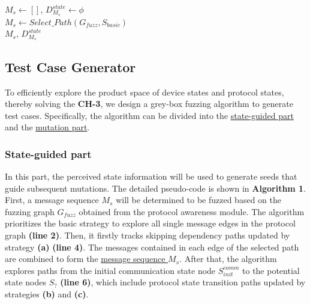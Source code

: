 \documentclass[10pt,journal,compsoc]{IEEEtran}
\begin{document}
\begin{algorithm}[t]
        \caption{Fuzzing Algorithm(State-Guided Part).}\label{alg:1}
        $M_{s} \gets [] $, $D_{M_{s}}^{state} \gets \phi$ \\
        $M_{s} \gets Select\_Path(G_{fuzz}, S_{basic})$ \\
        \Return $M_{s}$, $D_{M_{s}}^{state}$ 
        
\vspace{0cm}
\end{algorithm}

\subsection{Test Case Generator}  \label{6-1}

To efficiently explore the product space of device states and protocol states, thereby solving the \textbf{CH-3}, we design a grey-box fuzzing algorithm to generate test cases. Specifically, the algorithm can be divided into the \underline{state-guided part} and the \underline{mutation part}. 


\subsubsection{State-guided part} 
In this part, the perceived state information will be used to generate seeds that guide subsequent mutations. The detailed pseudo-code is shown in \textbf{Algorithm 1}. First, a message sequence $M_{s}$ will be determined to be fuzzed based on the fuzzing graph $G_{fuzz}$ obtained from the protocol awareness module. The algorithm prioritizes the basic strategy to explore all single message edges in the protocol graph \textbf{(line 2)}. Then, it firstly tracks skipping dependency paths updated by strategy \textbf{(a)} \textbf{(line 4)}. The messages contained in each edge of the selected path are combined to form the \underline{message sequence $M_{s}$}. After that, the algorithm explores paths from the initial communication state node $S_{init}^{comm}$ to the potential state nodes $S_{?}$ \textbf{(line 6)}, which include protocol state transition paths updated by strategies \textbf{(b)} and \textbf{(c)}. 
\end{document}
